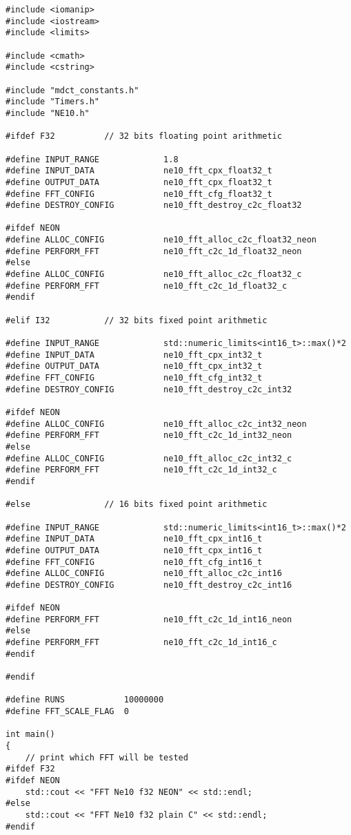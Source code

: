 \documentclass{article}
\begin{document}
\begin{lstlisting}
#include <iomanip>
#include <iostream>
#include <limits>

#include <cmath>
#include <cstring>

#include "mdct_constants.h"
#include "Timers.h"
#include "NE10.h"

#ifdef F32          // 32 bits floating point arithmetic

#define INPUT_RANGE             1.8
#define INPUT_DATA              ne10_fft_cpx_float32_t
#define OUTPUT_DATA             ne10_fft_cpx_float32_t
#define FFT_CONFIG              ne10_fft_cfg_float32_t
#define DESTROY_CONFIG          ne10_fft_destroy_c2c_float32

#ifdef NEON
#define ALLOC_CONFIG            ne10_fft_alloc_c2c_float32_neon
#define PERFORM_FFT             ne10_fft_c2c_1d_float32_neon
#else
#define ALLOC_CONFIG            ne10_fft_alloc_c2c_float32_c
#define PERFORM_FFT             ne10_fft_c2c_1d_float32_c
#endif

#elif I32           // 32 bits fixed point arithmetic

#define INPUT_RANGE             std::numeric_limits<int16_t>::max()*2
#define INPUT_DATA              ne10_fft_cpx_int32_t
#define OUTPUT_DATA             ne10_fft_cpx_int32_t
#define FFT_CONFIG              ne10_fft_cfg_int32_t
#define DESTROY_CONFIG          ne10_fft_destroy_c2c_int32

#ifdef NEON
#define ALLOC_CONFIG            ne10_fft_alloc_c2c_int32_neon
#define PERFORM_FFT             ne10_fft_c2c_1d_int32_neon
#else
#define ALLOC_CONFIG            ne10_fft_alloc_c2c_int32_c
#define PERFORM_FFT             ne10_fft_c2c_1d_int32_c
#endif

#else               // 16 bits fixed point arithmetic

#define INPUT_RANGE             std::numeric_limits<int16_t>::max()*2
#define INPUT_DATA              ne10_fft_cpx_int16_t
#define OUTPUT_DATA             ne10_fft_cpx_int16_t
#define FFT_CONFIG              ne10_fft_cfg_int16_t
#define ALLOC_CONFIG            ne10_fft_alloc_c2c_int16
#define DESTROY_CONFIG          ne10_fft_destroy_c2c_int16

#ifdef NEON
#define PERFORM_FFT             ne10_fft_c2c_1d_int16_neon
#else
#define PERFORM_FFT             ne10_fft_c2c_1d_int16_c
#endif

#endif

#define RUNS            10000000
#define FFT_SCALE_FLAG  0

int main()
{
    // print which FFT will be tested
#ifdef F32
#ifdef NEON
    std::cout << "FFT Ne10 f32 NEON" << std::endl;
#else
    std::cout << "FFT Ne10 f32 plain C" << std::endl;
#endif


\end{lstlisting}
\end{document}
